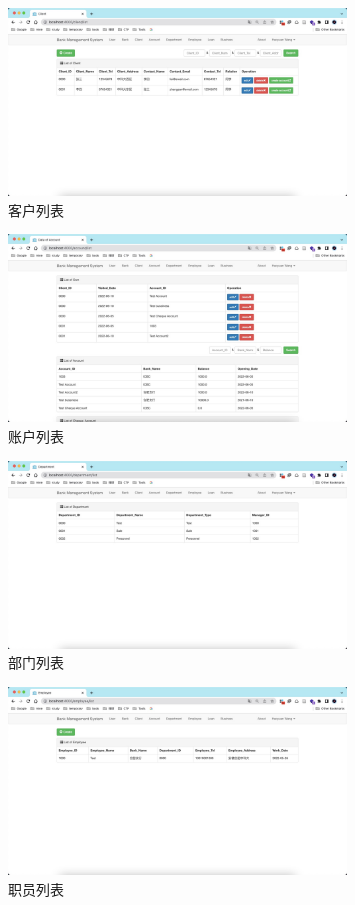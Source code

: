 \documentclass{article}
\begin{document}
    \begin{figure}[H]
        \centering
        \includegraphics[width=0.8\textwidth]{./fig/client_list.jpg}
        \caption[client_list]{客户列表}
    \end{figure}
    \begin{figure}[H]
        \centering
        \includegraphics[width=0.8\textwidth]{./fig/account_list.jpg}
        \caption[account_list]{账户列表}
    \end{figure}
    \begin{figure}[H]
        \centering
        \includegraphics[width=0.8\textwidth]{./fig/department_list.jpg}
        \caption[department_list]{部门列表}
    \end{figure}
    \begin{figure}[H]
        \centering
        \includegraphics[width=0.8\textwidth]{./fig/employee_list.jpg}
        \caption[employee_list]{职员列表}
    \end{figure}
\end{document}
